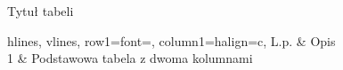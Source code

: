 \begin{table}[!ht]
    \centering
    \small
    \caption{Tytuł tabeli}
    \label{tbl:etykieta-tabeli}
    \begin{tblr}{%
        hlines,%
        vlines,%
        row{1}={font=\bfseries},%
        column{1}={halign=c},%
    }%
        L.p. & Opis                                \\
        1    & Podstawowa tabela z dwoma kolumnami \\
    \end{tblr}
\end{table}
